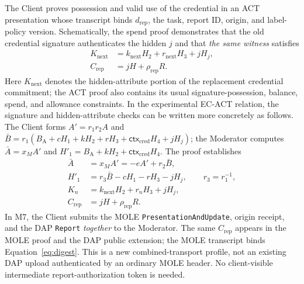 \documentclass[11pt]{article}
\newcommand{\Crep}{C_{\mathrm{rep}}}
\begin{document}
The Client proves possession and valid use of the credential in an ACT
presentation whose transcript binds $d_{\mathrm{rep}}$, the task, report
ID, origin, and label-policy version. Schematically, the spend proof
demonstrates that the old credential signature authenticates the hidden
$j$ and that \emph{the same witness} satisfies
\begin{align}
  K_{\mathrm{next}}&=k_{\mathrm{next}}H_2+r_{\mathrm{next}}H_3+jH_j,
    \label{eq:next}\\
  \Crep&=jH+\rho_{\mathrm{rep}}R.
    \label{eq:same-j}
\end{align}
Here $K_{\mathrm{next}}$ denotes the hidden-attribute portion of the
replacement credential commitment; the ACT proof also contains its usual
signature-possession, balance, spend, and allowance constraints. In the
experimental EC-ACT relation, the signature and hidden-attribute checks
can be written more concretely as follows. The Client forms
$A'=r_1r_2 A$ and
$\bar B=r_1(B_{\mathrm A}+cH_1+kH_2+rH_3+
\mathsf{ctx}_{\mathrm{cred}}H_4+jH_j)$; the Moderator computes
$\bar A=x_M A'$ and
$H'_1=B_{\mathrm A}+kH_2+\mathsf{ctx}_{\mathrm{cred}}H_4$.
The proof establishes
\begin{align}
  \bar A&=x_M A'=-eA'+r_2\bar B,\\
  H'_1&=r_3\bar B-cH_1-rH_3-jH_j,
    \qquad r_3=r_1^{-1},\\
  K_n&=k_{\mathrm{next}}H_2+r_nH_3+jH_j,\\
  \Crep&=jH+\rho_{\mathrm{rep}}R.
  \label{eq:spend}
\end{align}
In M7, the Client submits the MOLE \texttt{PresentationAndUpdate}, origin
receipt, and the DAP \texttt{Report} \emph{together} to the Moderator.
The same $\Crep$ appears in the MOLE proof and the DAP public extension;
the MOLE transcript binds Equation~\eqref{eq:digest}. This is a new
combined-transport profile, not an existing DAP upload authenticated by an
ordinary MOLE header. No client-visible intermediate report-authorization
token is needed.
\end{document}
